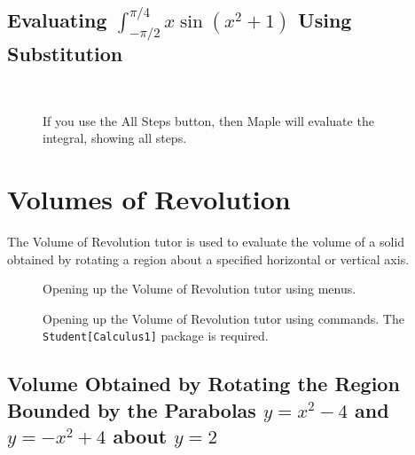 \clearpage

\subsection{Evaluating $\displaystyle\int_{-\pi/2}^{\pi/4} x\sin(x^2+1)$ Using Substitution}


\begin{figure}[h]
\caption{If you use the All Steps button, then Maple will evaluate the integral, showing all steps.}
\centering
{}\\
\end{figure}

\clearpage

\section{Volumes of Revolution}
\label{sec:volume_of_revolution_tutor}


The Volume of Revolution tutor is used to evaluate the volume of a solid obtained by rotating a region about a specified horizontal or vertical axis.

\begin{figure}[h]
\caption{Opening up the Volume of Revolution tutor using menus.}
\centering
{}
\end{figure}

\begin{figure}[h]
\caption{Opening up the Volume of Revolution tutor using commands. The \texttt{Student[Calculus1]} package is required.}
\centering
{}
\end{figure}

\newpage

\subsection{Volume Obtained by Rotating the Region Bounded by the Parabolas $y=x^2-4$ and $y=-x^2+4$ about $y=2$}


